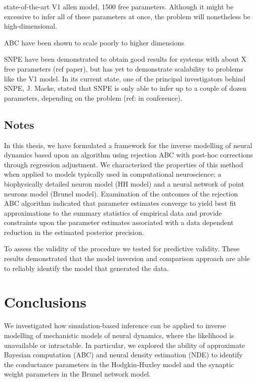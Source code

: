 state-of-the-art V1 allen model, 1500 free parameters. Although it might be excessive to infer all of these parameters at once, the problem will nonetheless be high-dimensional. 

ABC have been shown to scale poorly to higher dimensions

SNPE have been demonstrated to obtain good results for systems with about X free parameters (ref paper), but has yet to demonstrate scalability to problems like the V1 model. In its current state, one of the principal investigators behind SNPE, J. Macke, stated that SNPE is only able to infer up to a couple of dozen parameters, depending on the problem (ref: in conference).


\section{Notes}

In this thesis, we have formulated a framework for the inverse modelling of neural dynamics based upon an algorithm using rejection ABC with post-hoc corrections through regression adjustment. We characterized the properties of this method when applied to models typically used in computational neuroscience; a biophysically detailed neuron model (HH model) and a neural network of point neurons model (Brunel model). Examination of the outcomes of the rejection ABC algorithm indicated that parameter estimates converge to yield best fit approximations to the summary statistics of empirical data and provide constraints upon the parameter estimates associated with a data dependent reduction in the estimated posterior precision. 

To assess the validity of the procedure we tested for predictive validity. These results demonstrated that the model inversion and comparison approach are able to reliably identify the model that generated the data. 

\chapter{Conclusions}\label{chap:conclusions}

We investigated how simulation-based inference can be applied to inverse modelling of mechanistic models of neural dynamics, where the likelihood is unavailable or intractable. In particular, we explored the ability of approximate Bayesian computation (ABC) and neural density estimation (NDE) to identify the conductance parameters in the Hodgkin-Huxley model and the synaptic weight parameters in the Brunel network model. 

